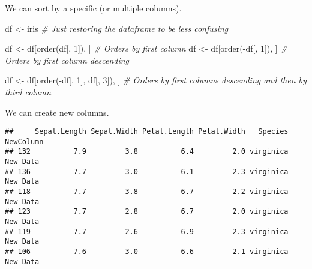 \documentclass[
]{book}
\newenvironment{Shaded}{\begin{snugshade}}{\end{snugshade}}
\newcommand{\CommentTok}[1]{\textcolor[rgb]{0.56,0.35,0.01}{\textit{#1}}}
\newcommand{\DecValTok}[1]{\textcolor[rgb]{0.00,0.00,0.81}{#1}}
\newcommand{\FunctionTok}[1]{\textcolor[rgb]{0.00,0.00,0.00}{#1}}
\newcommand{\NormalTok}[1]{#1}
\newcommand{\OtherTok}[1]{\textcolor[rgb]{0.56,0.35,0.01}{#1}}
\newcommand{\SpecialCharTok}[1]{\textcolor[rgb]{0.00,0.00,0.00}{#1}}
\newcommand{\StringTok}[1]{\textcolor[rgb]{0.31,0.60,0.02}{#1}}
\begin{document}
We can sort by a specific (or multiple columns).

\begin{Shaded}
\begin{Highlighting}[]
\NormalTok{df }\OtherTok{\textless{}{-}}\NormalTok{ iris  }\CommentTok{\# Just restoring the dataframe to be less confusing}


\NormalTok{df }\OtherTok{\textless{}{-}}\NormalTok{ df[}\FunctionTok{order}\NormalTok{(df[, }\DecValTok{1}\NormalTok{]), ]  }\CommentTok{\# Orders by first column}
\NormalTok{df }\OtherTok{\textless{}{-}}\NormalTok{ df[}\FunctionTok{order}\NormalTok{(}\SpecialCharTok{{-}}\NormalTok{df[, }\DecValTok{1}\NormalTok{]), ]  }\CommentTok{\# Orders by first column descending}

\NormalTok{df }\OtherTok{\textless{}{-}}\NormalTok{ df[}\FunctionTok{order}\NormalTok{(}\SpecialCharTok{{-}}\NormalTok{df[, }\DecValTok{1}\NormalTok{], df[, }\DecValTok{3}\NormalTok{]), ]  }\CommentTok{\# Orders by first columns descending and then by third column}
\end{Highlighting}
\end{Shaded}

We can create new columns.

\begin{Shaded}
\end{Shaded}

\begin{verbatim}
##     Sepal.Length Sepal.Width Petal.Length Petal.Width   Species NewColumn
## 132          7.9         3.8          6.4         2.0 virginica  New Data
## 136          7.7         3.0          6.1         2.3 virginica  New Data
## 118          7.7         3.8          6.7         2.2 virginica  New Data
## 123          7.7         2.8          6.7         2.0 virginica  New Data
## 119          7.7         2.6          6.9         2.3 virginica  New Data
## 106          7.6         3.0          6.6         2.1 virginica  New Data
\end{verbatim}
\end{document}
